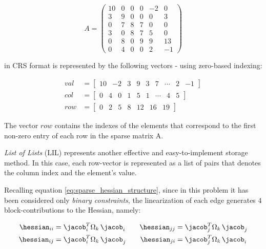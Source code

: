 \begin{equation*}
    A = 
        \begin{pmatrix}
            10 & 0 & 0 & 0 & -2 & 0 \\
            3 & 9 & 0 & 0 & 0 & 3 \\
            0 & 7 & 8 & 7 & 0 & 0 \\
            3 & 0 & 8 & 7 & 5 & 0 \\
            0 & 8 & 0 & 9 & 9 & 13 \\
            0 & 4 & 0 & 0 & 2 & -1 
        \end{pmatrix}
\end{equation*}

\noindent in CRS format is represented by the following vectors - using zero-based indexing:

\begin{align*}
    val &= \begin{bmatrix}10 & -2 & 3 & 9 & 3 & 7 & \cdots & 2 & -1\end{bmatrix} \\
    col &= \begin{bmatrix}0 & 4 & 0 & 1 & 5 & 1 & \cdots & 4 & 5\end{bmatrix} \\
    row &= \begin{bmatrix}0 & 2 & 5 & 8 & 12 & 16 & 19\end{bmatrix}     
\end{align*}

\noindent The vector $row$ contains the indexes of the elements that correspond to the first non-zero entry of each row in the sparse matrix A.

\textit{List of Lists} (LIL) represents another effective and easy-to-implement storage method. In this case, each row-vector is represented as a list of pairs that denotes the column index and the element's value.

Recalling equation \ref{eq:sparse_hessian_structure}, since in this problem it has been considered only \textit{binary constraints}, the linearization of each edge generates $4$ block-contributions to the Hessian, namely:

\begin{align*}
    \hessian_{ii} &= \jacob_i^T \Omega_k \, \jacob_i \qquad
    \hessian_{jj} = \jacob_j^T \Omega_k \, \jacob_j \\
    \hessian_{ij} &= \jacob_i^T \Omega_k \, \jacob_j \qquad
    \hessian_{ji} = \jacob_j^T \Omega_k \, \jacob_i 
\end{align*}

